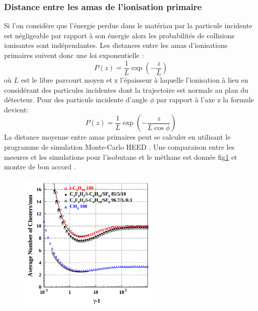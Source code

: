 \subsubsection{Distance entre les amas de l'ionisation primaire}
Si l'on considère que l'énergie perdue dans le matériau par la particule incidente est négligeable par rapport à son énergie alors les probabilités de collisions ionisantes sont indépendantes. Les distances entre les amas d'ionisations primaires suivent donc une loi exponentielle :
\begin{equation}
P(z)=\frac{1}{L}\exp\left(-\frac{z}{L}\right)
\end{equation} 
où $L$ est le libre parcourt moyen et z l'épaisseur à laquelle l'ionisation à lieu en considérant des particules incidentes dont la trajectoire est normale au plan du détecteur. Pour des particule incidente d'angle $\phi$ par rapport à l'axe z la formule devient:
\begin{equation}
P(z)=\frac{1}{L}\exp\left(-\frac{z}{L\cos\phi}\right)
\end{equation}
La distance moyenne entre amas primaires peut se calculer en utilisant le programme de simulation Monte-Carlo HEED \cite{HEED}. Une comparaison entre les mesures et les simulations pour l'isobutane et le méthane est donnée fig\ref{lambda} et montre de bon accord \cite{2004NIMPA}.  

\begin{figure}[ht!]
	\centering
	\includegraphics[width=0.60\textwidth]{RPC/lambda.png}
	\label{lambda}
\end{figure}


